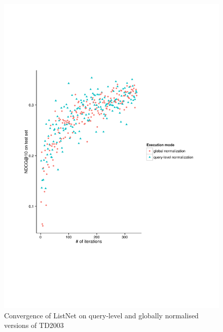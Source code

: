 \begin{figure}
\centering
\includegraphics[trim=5cm 5cm 5cm 5cm, scale=0.85]{gfx/convergence_td2003.pdf}
\caption{Convergence of ListNet on query-level and globally normalised versions of TD2003}
\label{fig:convergence_td2003}
\end{figure}

